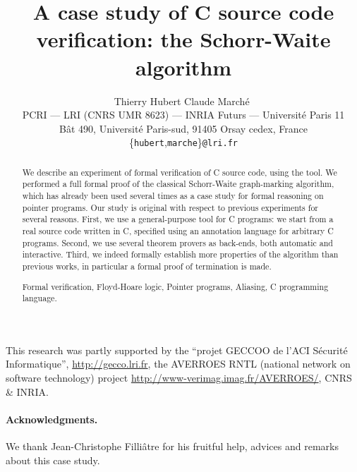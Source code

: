 \documentclass{ieee}
\begin{document}
\sloppy
{}

\title{A case study of C source code verification: the Schorr-Waite algorithm}
\author{~\hfill Thierry Hubert \hfill\hfill Claude March\'e \hfill~\\
PCRI --- LRI (CNRS UMR 8623) --- INRIA Futurs ---
  Universit\'e Paris 11 \\
B\^at 490, Universit\'e Paris-sud, 91405 Orsay cedex, France \\
\{\texttt{hubert},\texttt{marche}\}\texttt{@lri.fr} 
}
\maketitle

\begin{abstract}
  We describe an experiment of formal verification of C source code,
  using the \caduceus{} tool. We performed a full formal proof of the
  classical Schorr-Waite graph-marking algorithm, which has already
  been used several times as a case study for formal reasoning on
  pointer programs. Our study is original with respect to previous
  experiments for several reasons. First, we use a general-purpose
  tool for C programs: we start from a real source code written in
  C, specified using an annotation language for arbitrary C programs.
  Second, we use several theorem provers as back-ends, both automatic
  and interactive.  Third, we indeed formally establish more
  properties of the algorithm than previous works, in particular a
  formal proof of termination is made.

   Formal verification, Floyd-Hoare logic,
  Pointer programs, Aliasing, C programming language.
\end{abstract}

This research was partly supported by the ``projet
  GECCOO de l'ACI S\'ecurit\'e Informatique'',
  \url{http://gecco.lri.fr}, the AVERROES RNTL (national network on
  software technology) project
  \url{http://www-verimag.imag.fr/AVERROES/}, CNRS \& INRIA.

\bigskip







\bigskip
\paragraph{Acknowledgments.} 
We thank Jean-Christophe Filli\^atre for his fruitful help, advices and
remarks about this case study.



\end{document}
